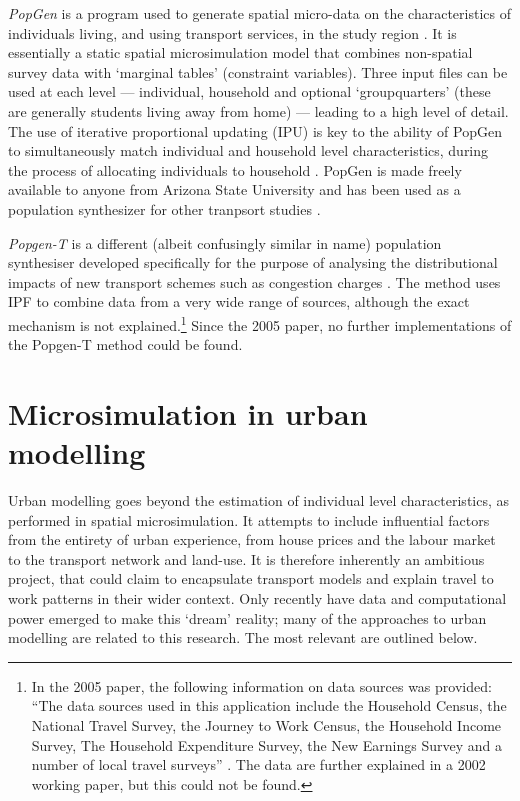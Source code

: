 \documentclass[a4paper, 11pt, twoside]{Thesis}
\begin{document}
\emph{PopGen} is a program used
to generate spatial micro-data on the characteristics of individuals
living, and using transport services, in the study region
\citep{Ravulaparthy2011}. It 
is essentially a static spatial microsimulation model that combines non-spatial
survey data with `marginal tables'
(constraint variables). Three input files can be used at each level ---
individual, household and optional `groupquarters'
(these are generally students living away from home) --- leading to a high level of
detail. The use of iterative proportional updating (IPU) is key to the
ability of PopGen to simultaneously match individual and household level
characteristics, during the process of allocating individuals to household
\citep{ye2009methodology}. PopGen is made freely available to
anyone from Arizona State University and has been used as a population
synthesizer for other tranpsort studies \citep{pendyala2012application}.

\emph{Popgen-T} is a different (albeit confusingly similar in name) population
synthesiser developed specifically for the purpose of analysing the
distributional impacts of new transport schemes such as congestion charges
\citep{Bonsall2005}. The method uses IPF to combine data from a very wide range
of sources, although the exact mechanism is not
explained.\footnote{In the 2005 paper, the following information on
data sources was provided: ``The data sources used in this application include the
Household Census, the National Travel Survey, the Journey to Work Census,
the Household Income Survey, The Household Expenditure Survey,
the New Earnings Survey and a number of local travel surveys'' \citep[p.~410]{Bonsall2005}.
The data are further explained in a 2002 working paper, but this could not
be found.} Since the 2005 paper, no further implementations of the Popgen-T method
could be found.




\section{Microsimulation in urban modelling}
\label{s:urbanmodel}
Urban modelling goes beyond the estimation of individual level
characteristics, as performed in spatial microsimulation.
It attempts to include influential factors from the entirety of
urban experience, from house prices and the labour market to
the transport network and land-use. It is therefore inherently
an ambitious project, that could claim to encapsulate transport models
and explain travel to work patterns in their wider context.
Only recently have data and computational power emerged to
make this `dream' reality; many of the approaches to urban
modelling are related to this research. The most relevant are outlined below.
\end{document}
